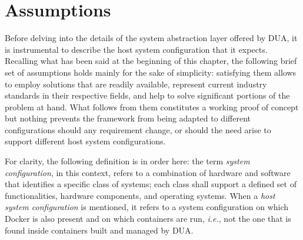 \section{Assumptions}
\label{sec:dua_assumptions}
Before delving into the details of the system abstraction layer offered by DUA, it is instrumental to describe the host system configuration that it expects. Recalling what has been said at the beginning of this chapter, the following brief set of assumptions holds mainly for the sake of simplicity: satisfying them allows to employ solutions that are readily available, represent current industry standards in their respective fields, and help to solve significant portions of the problem at hand. What follows from them constitutes a working proof of concept but nothing prevents the framework from being adapted to different configurations should any requirement change, or should the need arise to support different host system configurations.

For clarity, the following definition is in order here: the term \emph{system configuration}, in this context, refers to a combination of hardware and software that identifies a specific class of systems; each class shall support a defined set of functionalities, hardware components, and operating systems. When a \emph{host system configuration} is mentioned, it refers to a system configuration on which Docker is also present and on which containers are run, \emph{i.e.}, not the one that is found inside containers built and managed by DUA.

